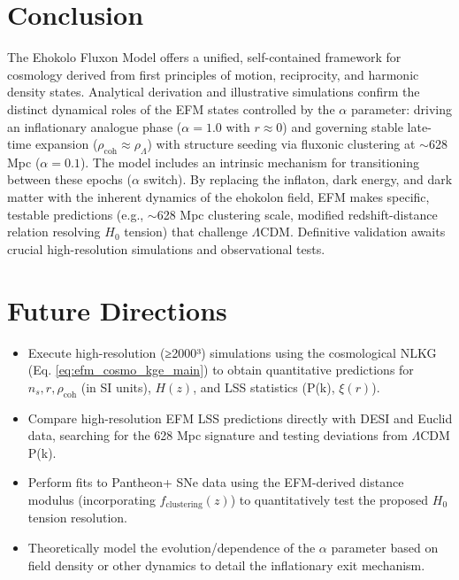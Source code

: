 \documentclass[11pt]{article}
\begin{document}
\section{Conclusion}
The Ehokolo Fluxon Model offers a unified, self-contained framework for cosmology derived from first principles of motion, reciprocity, and harmonic density states. Analytical derivation and illustrative simulations confirm the distinct dynamical roles of the EFM states controlled by the \(\alpha\) parameter: driving an inflationary analogue phase (\(\alpha=1.0\) with \(r \approx 0\)) and governing stable late-time expansion (\(\rho_{\text{coh}} \approx \rho_{\Lambda}\)) with structure seeding via fluxonic clustering at \(\sim\)628 Mpc (\(\alpha=0.1\)). The model includes an intrinsic mechanism for transitioning between these epochs (\(\alpha\) switch). By replacing the inflaton, dark energy, and dark matter with the inherent dynamics of the ehokolon field, EFM makes specific, testable predictions (e.g., \(\sim\)628 Mpc clustering scale, modified redshift-distance relation resolving \(H_0\) tension) that challenge \(\Lambda\)CDM. Definitive validation awaits crucial high-resolution simulations and observational tests.

\section{Future Directions}
\begin{itemize}
    \item Execute high-resolution (≥2000³) simulations using the cosmological NLKG (Eq. \ref{eq:efm_cosmo_kge_main}) to obtain quantitative predictions for \(n_s, r, \rho_{\text{coh}}\) (in SI units), \(H(z)\), and LSS statistics (P(k), \(\xi(r)\)).
    \item Compare high-resolution EFM LSS predictions directly with DESI and Euclid data, searching for the 628 Mpc signature and testing deviations from \(\Lambda\)CDM P(k).
    \item Perform fits to Pantheon+ SNe data using the EFM-derived distance modulus (incorporating \(f_{\text{clustering}}(z)\)) to quantitatively test the proposed \(H_0\) tension resolution.
    \item Theoretically model the evolution/dependence of the \(\alpha\) parameter based on field density or other dynamics to detail the inflationary exit mechanism.
\end{itemize}

\appendix
\end{document}
